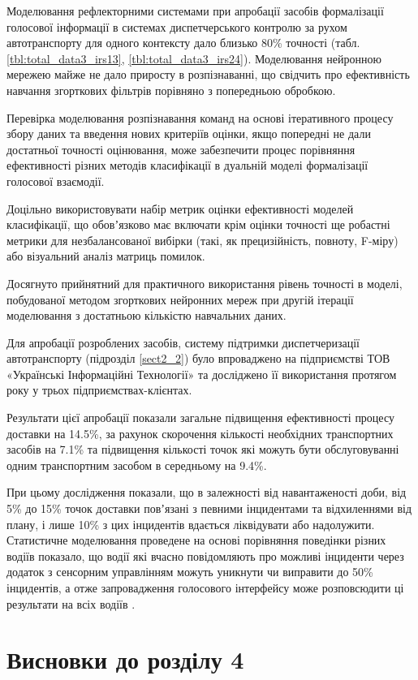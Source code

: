 Моделювання рефлекторними системами при апробації засобів формалізації голосової інформації в системах диспетчерського контролю за рухом автотранспорту для одного контексту дало близько 80\% точності (табл. \ref{tbl:total_data3_irs13}, \ref{tbl:total_data3_irs24}). Моделювання нейронною мережею майже не дало приросту в розпізнаванні, що свідчить про ефективність навчання згорткових фільтрів порівняно з попередньою обробкою.

Перевірка моделювання розпізнавання команд на основі ітеративного процесу збору даних та введення нових критеріїв оцінки, якщо попередні не дали достатньої точності оцінювання, може забезпечити процес порівняння ефективності різних методів класифікації в дуальній моделі формалізації голосової взаємодії.

Доцільно використовувати набір метрик оцінки ефективності моделей класифікації, що обовʼязково має включати крім оцінки точності ще робастні метрики для незбалансованої вибірки (такі, як прецизійність, повноту, F-міру) або візуальний аналіз матриць помилок. 

Досягнуто прийнятний для практичного використання рівень точності в моделі, побудованої методом згорткових нейронних мереж при другій ітерації моделювання з достатньою кількістю навчальних даних.

Для апробації розроблених засобів, систему підтримки диспетчеризації автотранспорту (підрозділ \ref{sect2_2}) було впроваджено на підприємстві ТОВ «Українські Інформаційні Технології» \cite{SngTrans} та досліджено її використання протягом року у трьох підприємствах-клієнтах.

Результати цієї апробації показали загальне підвищення ефективності процесу доставки на 14.5\%, за рахунок скорочення кількості необхідних транспортних засобів на 7.1\% та підвищення кількості точок які можуть бути обслуговуванні одним транспортним засобом в середньому на 9.4\%.

При цьому дослідження показали, що в залежності від навантаженості доби, від 5\% до 15\% точок доставки повʼязані з певними інцидентами та відхиленнями від плану, і лише 10\% з цих інцидентів вдається ліквідувати або надолужити. Статистичне моделювання проведене на основі порівняння поведінки різних водіїв показало, що водії які вчасно повідомляють про можливі інциденти через додаток з сенсорним управлінням можуть уникнути чи виправити до 50\% інцидентів, а отже запровадження голосового інтерфейсу може розповсюдити ці результати на всіх водіїв \cite{SngTrans}.

\section*{Висновки до розділу 4}

